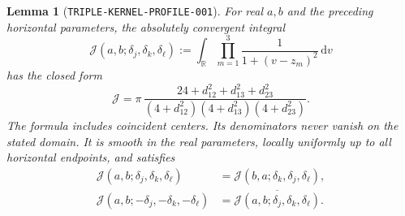 \documentclass[11pt]{article}
\newtheorem{lemma}{Lemma}
\newcommand{\dd}{\,\mathrm d}
\begin{document}
\begin{lemma}[\texttt{TRIPLE-KERNEL-PROFILE-001}]
\label{lem:triple-kernel-profile}
For real \(a,b\) and the preceding horizontal parameters, the absolutely
convergent integral
\begin{equation}\label{eq:triple-kernel-profile-integral}
 \mathcal J(a,b;\delta_j,\delta_k,\delta_\ell)
 :=\int_{\mathbb R}\prod_{m=1}^3\frac1{1+(v-z_m)^2}\dd v
\end{equation}
has the closed form
\begin{equation}\label{eq:triple-kernel-profile-rational}
 \mathcal J=\pi\,
 \frac{24+d_{12}^2+d_{13}^2+d_{23}^2}
 {(4+d_{12}^2)(4+d_{13}^2)(4+d_{23}^2)}.
\end{equation}
The formula includes coincident centers. Its denominators never vanish
on the stated domain. It is smooth in the real parameters, locally
uniformly up to all horizontal endpoints, and satisfies
\begin{align*}
 \mathcal J(a,b;\delta_j,\delta_k,\delta_\ell)
 &=\mathcal J(b,a;\delta_k,\delta_j,\delta_\ell),\\
 \mathcal J(a,b;-\delta_j,-\delta_k,-\delta_\ell)
 &=\overline{\mathcal J(a,b;\delta_j,\delta_k,\delta_\ell)}.
\end{align*}
\end{lemma}
\end{document}
